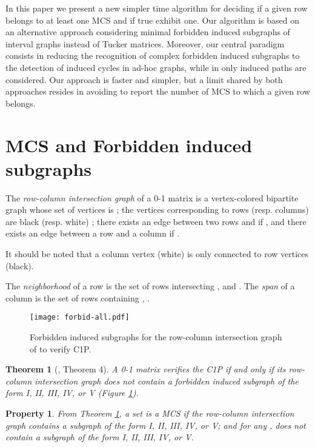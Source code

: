 \documentclass{article}
\newtheorem{property}{Property}
\newtheorem{theorem}{Theorem}
\begin{document}
In this paper we present a new simpler  time
algorithm for deciding if a given row belongs to at least one MCS and
if true exhibit one. Our algorithm is based on an
alternative approach considering minimal forbidden induced subgraphs
of interval graphs \cite{LB62} instead of Tucker matrices. Moreover,
our central paradigm consists in reducing the recognition of complex
forbidden induced subgraphs to the detection of induced cycles in
ad-hoc graphs, while in \cite{Blin2011} only induced paths are
considered. Our approach is faster and simpler, but a limit
shared by both approaches 
resides in  avoiding to report the number of MCS to which a given row belongs.


\section{MCS and Forbidden induced subgraphs}



The \emph{row-column intersection graph} of a 0-1 matrix 
 is a vertex-colored 
bipartite graph  whose set of vertices is  ;  
the vertices corresponding to rows (resp. columns) are black (resp. white) ;
there exists an edge between two rows  and  
if , and there exists an edge between a row 
 and a column  if . 

It should be noted that a column vertex (white) is only connected to row vertices (black).

The \emph{neighborhood}  of a row  is the set of rows intersecting ,
 and  
. The \emph{span}  of a column  
is the set of rows containing , .

\begin{figure}[h]
  \centering
\texttt{[image: forbid-all.pdf]}
\caption{Forbidden induced subgraphs for the row-column intersection graph of  to verify C1P.}
 \label{forbid}
\end{figure}

\begin{theorem}[\cite{LB62}, Theorem 4]
\label{thm-fordid}
A 0-1 matrix  verifies the C1P if and only 
if its row-column intersection 
graph does not contain a forbidden induced subgraph of the form I, II, III, IV, 
or V (Figure \ref{forbid}).
\end{theorem}

\begin{property}
From Theorem \ref{thm-fordid}, a set  is a MCS
if the row-column intersection graph  contains a 
subgraph of the 
form I, II, III, IV, or V; and for any , 
 does not contain a subgraph of the form I, II, III, 
IV, or V. 
\label{feat-mcs}
\end{property}
\end{document}
